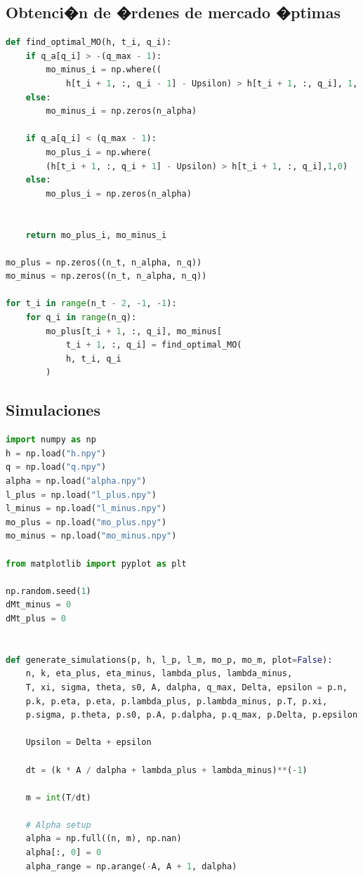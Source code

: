 \documentclass[12pt,a4paper,spanish]{article}%
\begin{document}
\begin{appendices}
\subsection{Obtenci�n de �rdenes de mercado �ptimas}
\begin{lstlisting}[language=Python]
def find_optimal_MO(h, t_i, q_i):
    if q_a[q_i] > -(q_max - 1):
        mo_minus_i = np.where((
        	h[t_i + 1, :, q_i - 1] - Upsilon) > h[t_i + 1, :, q_i], 1, 0)
    else:
        mo_minus_i = np.zeros(n_alpha)

    if q_a[q_i] < (q_max - 1):
        mo_plus_i = np.where(
        (h[t_i + 1, :, q_i + 1] - Upsilon) > h[t_i + 1, :, q_i],1,0)
    else:
        mo_plus_i = np.zeros(n_alpha)


    return mo_plus_i, mo_minus_i

mo_plus = np.zeros((n_t, n_alpha, n_q))
mo_minus = np.zeros((n_t, n_alpha, n_q))

for t_i in range(n_t - 2, -1, -1):
    for q_i in range(n_q):
        mo_plus[t_i + 1, :, q_i], mo_minus[
        	t_i + 1, :, q_i] = find_optimal_MO(
            h, t_i, q_i
        )
\end{lstlisting}
\subsection{Simulaciones}
\begin{lstlisting}[language=Python]
import numpy as np
h = np.load("h.npy")
q = np.load("q.npy")
alpha = np.load("alpha.npy")
l_plus = np.load("l_plus.npy")
l_minus = np.load("l_minus.npy")
mo_plus = np.load("mo_plus.npy")
mo_minus = np.load("mo_minus.npy")

from matplotlib import pyplot as plt

np.random.seed(1)
dMt_minus = 0
dMt_plus = 0


def generate_simulations(p, h, l_p, l_m, mo_p, mo_m, plot=False):
    n, k, eta_plus, eta_minus, lambda_plus, lambda_minus,
    T, xi, sigma, theta, s0, A, dalpha, q_max, Delta, epsilon = p.n, 
    p.k, p.eta, p.eta, p.lambda_plus, p.lambda_minus, p.T, p.xi,
    p.sigma, p.theta, p.s0, p.A, p.dalpha, p.q_max, p.Delta, p.epsilon

    Upsilon = Delta + epsilon

    dt = (k * A / dalpha + lambda_plus + lambda_minus)**(-1)
    
    m = int(T/dt)
    
    # Alpha setup
    alpha = np.full((n, m), np.nan)
    alpha[:, 0] = 0
    alpha_range = np.arange(-A, A + 1, dalpha)


\end{lstlisting}
\end{appendices}
\end{document}
